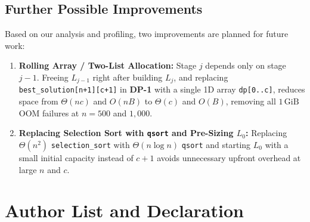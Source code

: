\documentclass[10pt, a4paper]{article}
\newcommand{\code}[1]{\texttt{\color{primary!90!black}#1}}
\begin{document}
\subsection{Further Possible Improvements}
\vspace{-0.15em}
Based on our analysis and profiling, two improvements are planned for future work:
\begin{enumerate}[label=\textbf{\color{primary}\arabic*.}]
  \item \textbf{Rolling Array / Two-List Allocation:} Stage $j$ depends only on stage $j - 1$. Freeing $L_{j-1}$ right after building $L_j$, and replacing \code{best\_solution[n+1][c+1]} in \textbf{DP-1} with a single 1D array \code{dp[0..c]}, reduces space from $\Theta(nc)$ and $O(nB)$ to $\Theta(c)$ and $O(B)$, removing all $1\,\text{GiB}$ OOM failures at $n = 500$ and $1{,}000$.
  \item \textbf{Replacing Selection Sort with \code{qsort} and Pre-Sizing $L_0$:} Replacing $\Theta(n^2)$ \code{selection\_sort} with $\Theta(n \log n)$ \code{qsort} and starting $L_0$ with a small initial capacity instead of $c + 1$ avoids unnecessary upfront overhead at large $n$ and $c$.
\end{enumerate}

\clearpage

\section*{Author List and Declaration}
\end{document}
